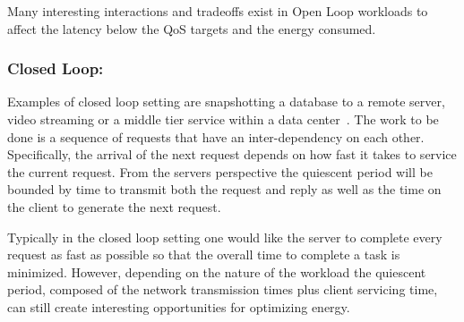 Many interesting interactions and tradeoffs exist in Open Loop workloads to affect the latency below the QoS targets and the energy consumed. 
 
\subsubsection{Closed Loop:}
\label{sec:workflow:closed_loop}
Examples of closed loop setting  are snapshotting a database to a remote server, video streaming or a middle tier service within a data center~\cite{Barroso:2009:DCI:1643608, oldi-study, oldi-pegasus, warehouse-power, energyproportion, WebSearch}.  The work to be done is a sequence of requests that have an inter-dependency on each other. Specifically, the arrival of the next request depends on how fast it takes to service the current request. From the servers perspective the quiescent period will be bounded by time to transmit both the request and reply as well as the time on the client to generate the next request.  

Typically in the closed loop setting one would like the server to complete every request as fast as possible so that the overall time to complete a task is minimized.  However, depending on the nature of the workload the quiescent period, composed of the network transmission times plus client servicing time, can still create interesting opportunities for optimizing energy.  




